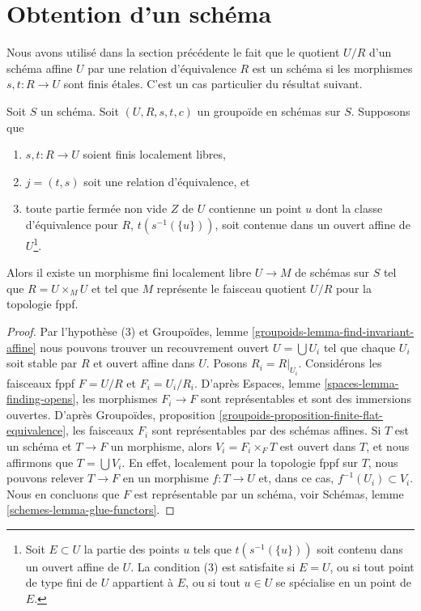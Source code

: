 \section{Obtention d'un schéma}
\label{section-getting-a-scheme}

\noindent
Nous avons utilisé dans la section précédente le fait que le quotient $U/R$ d'un
schéma affine $U$ par une relation d'équivalence $R$ est un schéma si les
morphismes $s, t : R \to U$ sont finis \'etales. C'est un cas particulier
du résultat suivant.

\begin{proposition}
\label{proposition-finite-flat-equivalence-global}
Soit $S$ un schéma.
Soit $(U, R, s, t, c)$ un groupoïde en schémas sur $S$.
Supposons que
\begin{enumerate}
\item $s, t : R \to U$ soient finis localement libres,
\item $j = (t, s)$ soit une relation d'équivalence, et
\item toute partie fermée non vide $Z$ de $U$ contienne un point
$u$ dont la classe d'équivalence pour $R$, $t(s^{-1}(\{u\}))$, soit contenue
dans un ouvert affine de $U$\footnote{Soit $E \subset U$ la
partie des points $u$ tels que $t(s^{-1}(\{u\}))$
soit contenu dans un ouvert affine de $U$. La condition (3) est satisfaite
si $E = U$, ou si tout point de type fini de $U$ appartient à $E$, ou
si tout $u \in U$ se spécialise en un point de $E$.}.
\end{enumerate}
Alors il existe un morphisme fini localement libre $U \to M$
de schémas sur $S$ tel que $R = U \times_M U$ et tel que $M$
représente le faisceau quotient $U/R$ pour la topologie fppf.
\end{proposition}

\begin{proof}
Par l'hypothèse (3) et
Groupoïdes, lemme \ref{groupoids-lemma-find-invariant-affine}
nous pouvons trouver un recouvrement ouvert $U = \bigcup U_i$ tel que chaque $U_i$
soit stable par $R$ et ouvert affine dans $U$. Posons $R_i = R|_{U_i}$.
Considérons les faisceaux fppf $F = U/R$ et $F_i = U_i/R_i$.
D'après Espaces, lemme \ref{spaces-lemma-finding-opens}, les morphismes
$F_i \to F$ sont représentables et sont des immersions ouvertes.
D'après Groupoïdes, proposition \ref{groupoids-proposition-finite-flat-equivalence},
les faisceaux $F_i$ sont représentables par des schémas affines.
Si $T$ est un schéma et $T \to F$ un morphisme, alors $V_i = F_i \times_F T$
est ouvert dans $T$, et nous affirmons que $T = \bigcup V_i$. En effet,
localement pour la topologie fppf sur $T$, nous pouvons relever $T \to F$ en un morphisme
$f : T \to U$ et, dans ce cas, $f^{-1}(U_i) \subset V_i$.
Nous en concluons que $F$ est représentable par un schéma, voir
Schémas, lemme \ref{schemes-lemma-glue-functors}.
\end{proof}

